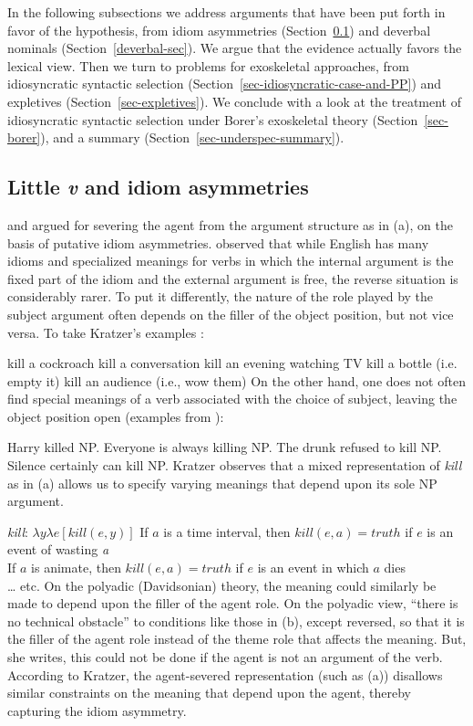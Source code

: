 In the following subsections we address arguments that have been put forth in favor of the \littlev
hypothesis, from idiom asymmetries (Section~\ref{idiom-asym}) and deverbal nominals
(Section~\ref{deverbal-sec}).  We argue that the evidence actually favors the lexical view.  Then we
turn to problems for exoskeletal approaches, from idiosyncratic syntactic selection
(Section~\ref{sec-idiosyncratic-case-and-PP}) and expletives (Section~\ref{sec-expletives}).  We
conclude with a look at the treatment of idiosyncratic syntactic selection under Borer's exoskeletal theory (Section~\ref{sec-borer}), and a summary
(Section~\ref{sec-underspec-summary}).

\subsection{Little \emph{v} and idiom asymmetries}
\label{idiom-asym}

\mbox{}\citet{Marantz84a} and \citet{Kratzer96a} argued for severing the agent from the argument structure as in (a), on the basis of putative idiom asymmetries.
\citet{Marantz84a} observed that while English has many idioms and specialized meanings for verbs in
which the internal argument is the fixed part of the idiom and the external argument is free, the
reverse situation is considerably rarer. To put it differently, the nature of the role played by the
subject argument often depends on the filler of the object position, but not vice versa. To take
Kratzer's examples \citep[]{Kratzer96a}: 

\eal
\ex kill a cockroach
\ex kill a conversation
\ex kill an evening watching TV 
\ex kill a bottle (i.e. empty it) 
\ex kill an audience (i.e., wow them)
\zl
On the other hand, one does not often find special meanings of a verb associated with the choice of subject, leaving the object position open (examples from ):

\eal
\ex Harry killed NP.
\ex Everyone is always killing NP. 
\ex The drunk refused to kill NP. 
\ex Silence certainly can kill NP.
\zl
Kratzer observes that a mixed representation of \emph{kill} as in (a) allows us to specify varying meanings that depend upon its sole NP argument.  

\eal
\ex \emph{kill}: $\lambda y\lambda e[kill(e, y)]$ 
\ex If $a$ is a time interval, then $kill(e, a) = truth$ if $e$ is an event of wasting \emph{a} \\
If $a$ is animate, then $kill(e, a) = truth$ if $e$ is an event in which $a$ dies \\
\ldots{} etc.
\zl
On the polyadic (Davidsonian) theory, the meaning could similarly be made to depend upon the filler of the agent role.  On the polyadic view, ``there is no technical obstacle'' \citep[]{Kratzer96a} to conditions like those in (b), except reversed, so that it is the filler of the agent role instead of the theme role that affects the meaning.  But, she writes, this could not be done if the agent is not an argument of the verb.  According to Kratzer, the agent-severed representation (such as (a)) disallows similar constraints on the meaning that depend upon the agent, thereby capturing the idiom asymmetry.  

